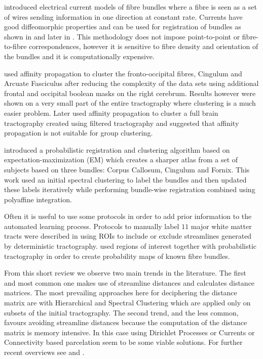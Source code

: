 \documentclass{bioinfo}
\begin{document}
\citet{Durrleman2009} introduced electrical current models of fibre
bundles where a fibre is seen as a set of wires sending information in
one direction at constant rate. Currents have good diffeomorphic
properties and can be used for registration of bundles as shown in
\citet{Durrleman2009} and later in \citet{durrleman2010registration}.
This methodology does not impose point-to-point or fibre-to-fibre
correspondences, however it is sensitive to fibre density and
orientation of the bundles and it is computationally expensive.

\citet*{leemans17new} used affinity propagation to cluster the
fronto-occipital fibres, Cingulum and Arcuate Fasciculus after reducing
the complexity of the data sets using additional frontal and occipital
boolean masks on the right cerebrum. Results however were shown on a
very small part of the entire tractography where clustering is a much
easier problem.  Later \citet{malcolm2009filtered} used affinity
propagation to cluster a full brain tractography created using filtered
tractography and suggested that affinity propagation is not suitable for
group clustering.

\citet{ziyan2009consistency} introduced a probabilistic registration and
clustering algorithm based on expectation-maximization (EM) which
creates a sharper atlas from a set of subjects based on three bundles:
Corpus Callosum, Cingulum and Fornix. This work used an initial
spectral clustering \citep{ODonnell_IEEETMI07} to label the bundles and
then updated these labels iteratively while performing bundle-wise
registration combined using polyaffine integration.

Often it is useful to use some protocols in order to add prior
information to the automated learning process. Protocols to manually
label $11$ major white matter tracts were described in
\citet{Wakana2007NeuroImage} using ROIs to include or exclude
streamlines generated by deterministic tractography.
\citet{Hua2008NeuroImage} used regions of interest together with
probabilistic tractography in order to create probability maps of known
fibre bundles.

From this short review we observe two main trends in the literature.
The first and most common one makes use of streamline distances and
calculates distance matrices. The most prevailing approaches here for
deciphering the distance matrix are with Hierarchical and Spectral
Clustering which are applied only on subsets of the initial
tractography. The second trend, and the less common, favours avoiding
streamline distances because the computation of the distance matrix is
memory intensive.  In this case using Dirichlet Processes or Currents or
Connectivity based parcelation seem to be some viable solutions. For
further recent overviews see \citet{ODonnell_IEEETMI07} and
\citet{wang2010tractography}.
\end{document}
